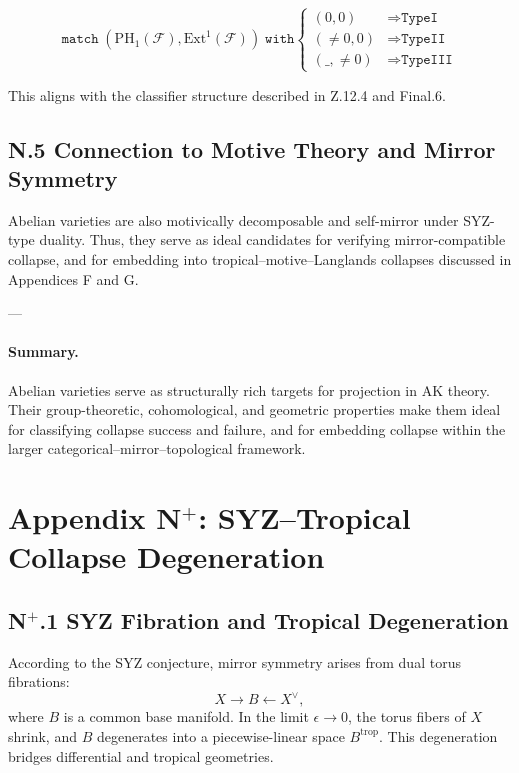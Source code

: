 \documentclass[11pt]{article}
\begin{document}
\begin{axiom}
\begin{axiom}
{{\[
\texttt{match} \; (\mathrm{PH}_1(\mathcal{F}), \mathrm{Ext}^1(\mathcal{F})) \; \texttt{with}
\begin{cases}
(0, 0) &\Rightarrow \texttt{TypeI} \\
(\neq 0, 0) &\Rightarrow \texttt{TypeII} \\
(\_, \neq 0) &\Rightarrow \texttt{TypeIII}
\end{cases}
\]

This aligns with the classifier structure described in Z.12.4 and Final.6.


\subsection*{N.5 Connection to Motive Theory and Mirror Symmetry}

Abelian varieties are also motivically decomposable and self-mirror under SYZ-type duality.  
Thus, they serve as ideal candidates for verifying mirror-compatible collapse, and for embedding into tropical–motive–Langlands collapses discussed in Appendices F and G.

---

\paragraph{Summary.}

Abelian varieties serve as structurally rich targets for projection in AK theory.  
Their group-theoretic, cohomological, and geometric properties make them ideal for classifying collapse success and failure, and for embedding collapse within the larger categorical–mirror–topological framework.



\section*{Appendix N$^+$: SYZ–Tropical Collapse Degeneration}

\subsection*{N$^+$.1 SYZ Fibration and Tropical Degeneration}
According to the SYZ conjecture, mirror symmetry arises from dual torus fibrations:
\[
X \to B \leftarrow X^\vee,
\]
where \( B \) is a common base manifold. In the limit \( \epsilon \to 0 \), the torus fibers of \( X \) shrink, and \( B \) degenerates into a piecewise-linear space \( B^{\mathrm{trop}} \). This degeneration bridges differential and tropical geometries.

}}
\end{axiom}
\end{axiom}
\end{document}
